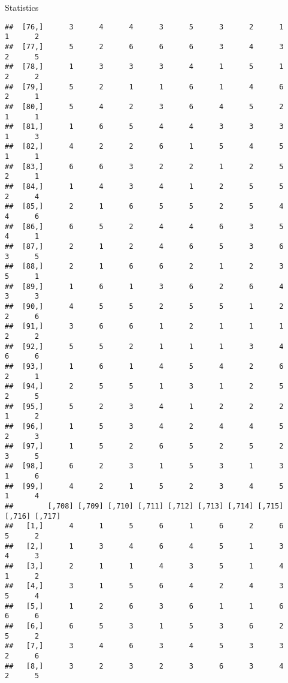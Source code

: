 \documentclass[
  ignorenonframetext,
]{beamer}
\begin{document}
\begin{frame}[fragile]{Statistics}
\begin{verbatim}
##  [76,]      3      4      4      3      5      3      2      1      1      2
##  [77,]      5      2      6      6      6      3      4      3      2      5
##  [78,]      1      3      3      3      4      1      5      1      2      2
##  [79,]      5      2      1      1      6      1      4      6      2      1
##  [80,]      5      4      2      3      6      4      5      2      1      1
##  [81,]      1      6      5      4      4      3      3      3      1      3
##  [82,]      4      2      2      6      1      5      4      5      1      1
##  [83,]      6      6      3      2      2      1      2      5      2      1
##  [84,]      1      4      3      4      1      2      5      5      2      4
##  [85,]      2      1      6      5      5      2      5      4      4      6
##  [86,]      6      5      2      4      4      6      3      5      4      1
##  [87,]      2      1      2      4      6      5      3      6      3      5
##  [88,]      2      1      6      6      2      1      2      3      5      1
##  [89,]      1      6      1      3      6      2      6      4      3      3
##  [90,]      4      5      5      2      5      5      1      2      2      6
##  [91,]      3      6      6      1      2      1      1      1      2      2
##  [92,]      5      5      2      1      1      1      3      4      6      6
##  [93,]      1      6      1      4      5      4      2      6      2      1
##  [94,]      2      5      5      1      3      1      2      5      2      5
##  [95,]      5      2      3      4      1      2      2      2      1      2
##  [96,]      1      5      3      4      2      4      4      5      2      3
##  [97,]      1      5      2      6      5      2      5      2      3      5
##  [98,]      6      2      3      1      5      3      1      3      1      6
##  [99,]      4      2      1      5      2      3      4      5      1      4
##        [,708] [,709] [,710] [,711] [,712] [,713] [,714] [,715] [,716] [,717]
##   [1,]      4      1      5      6      1      6      2      6      5      2
##   [2,]      1      3      4      6      4      5      1      3      4      3
##   [3,]      2      1      1      4      3      5      1      4      1      2
##   [4,]      3      1      5      6      4      2      4      3      5      4
##   [5,]      1      2      6      3      6      1      1      6      6      6
##   [6,]      6      5      3      1      5      3      6      2      5      2
##   [7,]      3      4      6      3      4      5      3      3      2      6
##   [8,]      3      2      3      2      3      6      3      4      2      5

\end{verbatim}
\end{frame}
\end{document}
